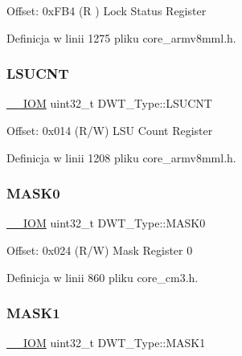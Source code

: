 Offset\+: 0x\+F\+B4 (R ) Lock Status Register 

Definicja w linii 1275 pliku core\+\_\+armv8mml.\+h.

\mbox{\label{struct_d_w_t___type_acc05d89bdb1b4fe2fa499920ec02d0b1}} 
\subsubsection{\texorpdfstring{L\+S\+U\+C\+NT}{LSUCNT}}
{\footnotesize\ttfamily \hyperlink{core__sc300_8h_ab6caba5853a60a17e8e04499b52bf691}{\+\_\+\+\_\+\+I\+OM} uint32\+\_\+t D\+W\+T\+\_\+\+Type\+::\+L\+S\+U\+C\+NT}

Offset\+: 0x014 (R/W) L\+SU Count Register 

Definicja w linii 1208 pliku core\+\_\+armv8mml.\+h.

\mbox{\label{struct_d_w_t___type_a821eb5e71f340ec077efc064cfc567db}} 
\subsubsection{\texorpdfstring{M\+A\+S\+K0}{MASK0}}
{\footnotesize\ttfamily \hyperlink{core__sc300_8h_ab6caba5853a60a17e8e04499b52bf691}{\+\_\+\+\_\+\+I\+OM} uint32\+\_\+t D\+W\+T\+\_\+\+Type\+::\+M\+A\+S\+K0}

Offset\+: 0x024 (R/W) Mask Register 0 

Definicja w linii 860 pliku core\+\_\+cm3.\+h.

\mbox{\label{struct_d_w_t___type_aabf94936c9340e62fed836dcfb152405}} 
\subsubsection{\texorpdfstring{M\+A\+S\+K1}{MASK1}}
{\footnotesize\ttfamily \hyperlink{core__sc300_8h_ab6caba5853a60a17e8e04499b52bf691}{\+\_\+\+\_\+\+I\+OM} uint32\+\_\+t D\+W\+T\+\_\+\+Type\+::\+M\+A\+S\+K1}

